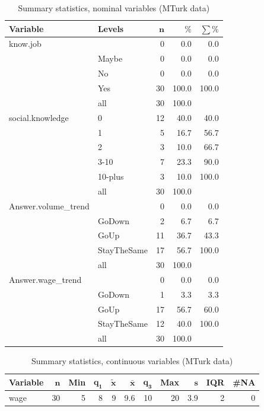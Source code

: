 \documentclass[a4paper,10pt]{article}\usepackage[]{graphicx}\usepackage[]{color}
\begin{document}
\begin{table}[ht]
\centering
{\footnotesize
\begin{tabular}{ll|rrr}
 \textbf{Variable} & \textbf{Levels} & $\mathbf{n}$ & $\mathbf{\%}$ & $\mathbf{\sum \%}$ \\ 
  \hline
know.job &  & 0 & 0.0 & 0.0 \\ 
   & Maybe & 0 & 0.0 & 0.0 \\ 
   & No & 0 & 0.0 & 0.0 \\ 
   & Yes & 30 & 100.0 & 100.0 \\ 
   \hline
 & all & 30 & 100.0 &  \\ 
   \hline
\hline
social.knowledge & 0 & 12 & 40.0 & 40.0 \\ 
   & 1 & 5 & 16.7 & 56.7 \\ 
   & 2 & 3 & 10.0 & 66.7 \\ 
   & 3-10 & 7 & 23.3 & 90.0 \\ 
   & 10-plus & 3 & 10.0 & 100.0 \\ 
   \hline
 & all & 30 & 100.0 &  \\ 
   \hline
\hline
Answer.volume\_trend &  & 0 & 0.0 & 0.0 \\ 
   & GoDown & 2 & 6.7 & 6.7 \\ 
   & GoUp & 11 & 36.7 & 43.3 \\ 
   & StayTheSame & 17 & 56.7 & 100.0 \\ 
   \hline
 & all & 30 & 100.0 &  \\ 
   \hline
\hline
Answer.wage\_trend &  & 0 & 0.0 & 0.0 \\ 
   & GoDown & 1 & 3.3 & 3.3 \\ 
   & GoUp & 17 & 56.7 & 60.0 \\ 
   & StayTheSame & 12 & 40.0 & 100.0 \\ 
   \hline
 & all & 30 & 100.0 &  \\ 
   \hline
\hline
\end{tabular}
}
\caption{Summary statistics, nominal variables (MTurk data)} 
\label{tab1:35-9030}
\end{table}
\begin{table}[ht]
\centering
{\footnotesize
\begin{tabular}{lrrrrrrrrrr}
 \textbf{Variable} & $\mathbf{n}$ & \textbf{Min} & $\mathbf{q_1}$ & $\mathbf{\widetilde{x}}$ & $\mathbf{\bar{x}}$ & $\mathbf{q_3}$ & \textbf{Max} & $\mathbf{s}$ & \textbf{IQR} & \textbf{\#NA} \\ 
  \hline
wage & 30 & 5 & 8 & 9 & 9.6 & 10 & 20 & 3.9 & 2 & 0 \\ 
  \end{tabular}
}
\caption{Summary statistics, continuous variables (MTurk data)} 
\label{tab2:35-9030}
\end{table}
\end{document}
